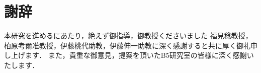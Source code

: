 \newpage
{}
\chapter*{謝辞}
本研究を進めるにあたり，絶えず御指導，御教授くださいました
福見稔教授，柏原考爾准教授，伊藤桃代助教，伊藤伸一助教に深く感謝すると共に厚く御礼申し上げます．
また，貴重な御意見，提案を頂いたB5研究室の皆様に深く感謝いたします．
